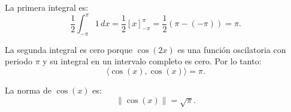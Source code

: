 \begin{itemize}
    La primera integral es:
    \[
        \frac{1}{2} \int_{-\pi}^{\pi} 1 \, dx = \frac{1}{2} [x]_{-\pi}^{\pi} = \frac{1}{2} (\pi - (-\pi)) = \pi.
    \]

    La segunda integral es cero porque $\cos(2x)$ es una función oscilatoria con periodo $\pi$ y su integral en un intervalo completo es cero. Por lo tanto:
    \[
        \langle \cos(x), \cos(x) \rangle = \pi.
    \]

    La norma de $\cos(x)$ es:
    \[
        \|\cos(x)\| = \sqrt{\pi}.
    \]
\end{itemize}